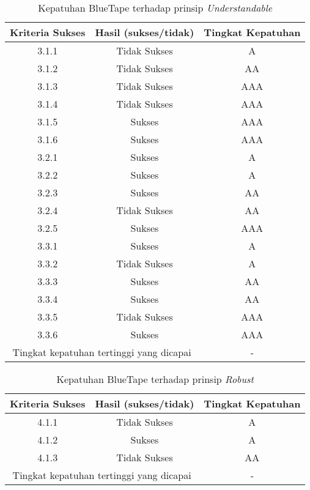 \begin{table}[H]
    \centering 
    \caption{Kepatuhan BlueTape terhadap prinsip \textit{Understandable}}
    \label{tab:kepatuhan_bluetape_understandable}
    \begin{tabular}{|c|c|c|}
        \toprule
        Kriteria Sukses & Hasil (sukses/tidak) & Tingkat Kepatuhan \\

        \midrule
        \rowcolor{darkred} 3.1.1 & Tidak Sukses & A \\
        \rowcolor{brightred} 3.1.2 & Tidak Sukses & AA \\
        \rowcolor{pink} 3.1.3 & Tidak Sukses & AAA \\
        \rowcolor{pink} 3.1.4 & Tidak Sukses & AAA \\
        3.1.5 & Sukses & AAA \\
        3.1.6 & Sukses & AAA \\
        3.2.1 & Sukses & A \\
        3.2.2 & Sukses & A \\
        3.2.3 & Sukses & AA \\
        \rowcolor{brightred} 3.2.4 & Tidak Sukses & AA \\
        3.2.5 & Sukses & AAA \\
        3.3.1 & Sukses & A \\
        \rowcolor{darkred} 3.3.2 & Tidak Sukses & A \\
        3.3.3 & Sukses & AA \\
        3.3.4 & Sukses & AA \\
        \rowcolor{pink} 3.3.5 & Tidak Sukses & AAA \\
        3.3.6 & Sukses & AAA \\

        \bottomrule
        \multicolumn{2}{|c|}{Tingkat kepatuhan tertinggi yang dicapai} & - \\
        \bottomrule

    \end{tabular}
\end{table}
\begin{table}[H]
    \centering 
    \caption{Kepatuhan BlueTape terhadap prinsip \textit{Robust}}
    \label{tab:kepatuhan_bluetape_robust}
    \begin{tabular}{|c|c|c|}
        \toprule
        Kriteria Sukses & Hasil (sukses/tidak) & Tingkat Kepatuhan\\

        \midrule
        \rowcolor{darkred} 4.1.1 & Tidak Sukses & A \\
        4.1.2 & Sukses & A \\
        \rowcolor{brightred} 4.1.3 & Tidak Sukses & AA \\

        \bottomrule
        \multicolumn{2}{|c|}{Tingkat kepatuhan tertinggi yang dicapai} & - \\
        \bottomrule

    \end{tabular} 
\end{table}

